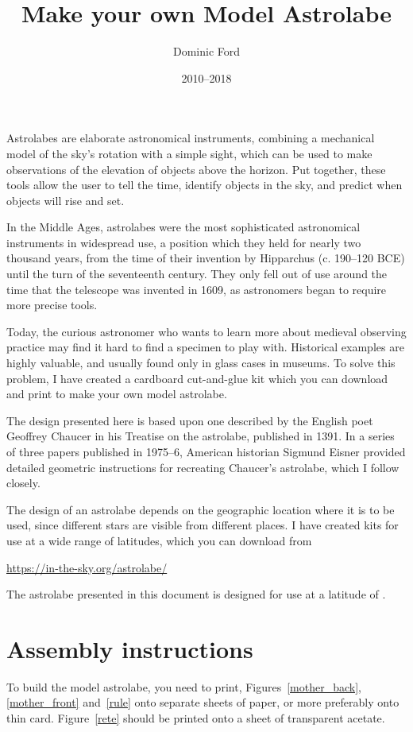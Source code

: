 \documentclass[a4paper,onecolumn,10pt]{article}
\title{Make your own Model Astrolabe}
\author{Dominic Ford}
\date{2010--2018}
\begin{document}
\maketitle
\setcounter{footnote}{1}

Astrolabes are elaborate astronomical instruments, combining a mechanical model
of the sky's rotation with a simple sight, which can be used to make
observations of the elevation of objects above the horizon. Put together, these
tools allow the user to tell the time, identify objects in the sky, and predict
when objects will rise and set.

In the Middle Ages, astrolabes were the most sophisticated astronomical
instruments in widespread use, a position which they held for nearly two
thousand years, from the time of their invention by Hipparchus (c. 190--120
BCE) until the turn of the seventeenth century. They only fell out of use
around the time that the telescope was invented in 1609, as astronomers began
to require more precise tools.

Today, the curious astronomer who wants to learn more about medieval observing
practice may find it hard to find a specimen to play with. Historical examples
are highly valuable, and usually found only in glass cases in museums. To solve
this problem, I have created a cardboard cut-and-glue kit which you can
download and print to make your own model astrolabe.

The design presented here is based upon one described by the English poet
Geoffrey Chaucer in his Treatise on the astrolabe, published in 1391. In a
series of three papers published in 1975--6, American historian Sigmund Eisner
provided detailed geometric instructions for recreating Chaucer's astrolabe,
which I follow closely.

The design of an astrolabe depends on the geographic location where it is to be
used, since different stars are visible from different places. I have created
kits for use at a wide range of latitudes, which you can download from

\url{https://in-the-sky.org/astrolabe/}

The astrolabe presented in this document is designed for use at a latitude of
.

\section*{Assembly instructions}

To build the model astrolabe, you need to print, Figures~\ref{mother_back},
\ref{mother_front} and~\ref{rule} onto separate sheets of paper, or more
preferably onto thin card. Figure~\ref{rete} should be printed onto a sheet of
transparent acetate.
\end{document}
